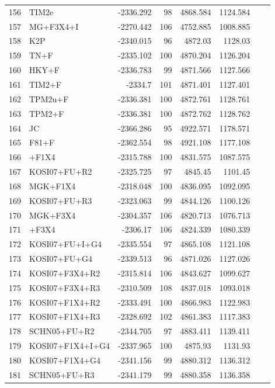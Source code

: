 \documentclass[12pt]{article}
\begin{document}
\begin{longtable}{clrrrrrr}
	156 & TIM2e & -2336.292 & 98 & 4868.584 & 1124.584 \\ 
	157 & MG+F3X4+I & -2270.442 & 106 & 4752.885 & 1008.885 \\ 
	158 & K2P & -2340.015 & 96 & 4872.03 & 1128.03 \\ 
	159 & TN+F & -2335.102 & 100 & 4870.204 & 1126.204 \\ 
	160 & HKY+F & -2336.783 & 99 & 4871.566 & 1127.566 \\ 
	161 & TIM2+F & -2334.7 & 101 & 4871.401 & 1127.401 \\ 
	162 & TPM2u+F & -2336.381 & 100 & 4872.761 & 1128.761 \\ 
	163 & TPM2+F & -2336.381 & 100 & 4872.762 & 1128.762 \\ 
	164 & JC & -2366.286 & 95 & 4922.571 & 1178.571 \\ 
	165 & F81+F & -2362.554 & 98 & 4921.108 & 1177.108 \\ 
	166 & \gy+F1X4 & -2315.788 & 100 & 4831.575 & 1087.575 \\ 
	167 & KOSI07+FU+R2 & -2325.725 & 97 & 4845.45 & 1101.45 \\ 
	168 & MGK+F1X4 & -2318.048 & 100 & 4836.095 & 1092.095 \\ 
	169 & KOSI07+FU+R3 & -2323.063 & 99 & 4844.126 & 1100.126 \\ 
	170 & MGK+F3X4 & -2304.357 & 106 & 4820.713 & 1076.713 \\ 
	171 & \gy+F3X4 & -2306.17 & 106 & 4824.339 & 1080.339 \\ 
	172 & KOSI07+FU+I+G4 & -2335.554 & 97 & 4865.108 & 1121.108 \\ 
	173 & KOSI07+FU+G4 & -2339.513 & 96 & 4871.026 & 1127.026 \\ 
	174 & KOSI07+F3X4+R2 & -2315.814 & 106 & 4843.627 & 1099.627 \\ 
	175 & KOSI07+F3X4+R3 & -2310.509 & 108 & 4837.018 & 1093.018 \\ 
	176 & KOSI07+F1X4+R2 & -2333.491 & 100 & 4866.983 & 1122.983 \\ 
	177 & KOSI07+F1X4+R3 & -2328.692 & 102 & 4861.383 & 1117.383 \\ 
	178 & SCHN05+FU+R2 & -2344.705 & 97 & 4883.411 & 1139.411 \\ 
	179 & KOSI07+F1X4+I+G4 & -2337.965 & 100 & 4875.93 & 1131.93 \\ 
	180 & KOSI07+F1X4+G4 & -2341.156 & 99 & 4880.312 & 1136.312 \\ 
	181 & SCHN05+FU+R3 & -2341.179 & 99 & 4880.358 & 1136.358 \\ 

\end{longtable}
\end{document}
